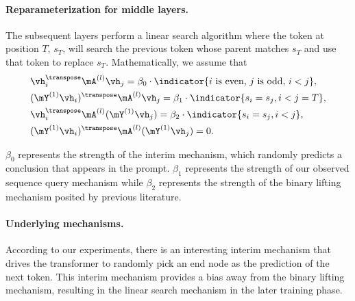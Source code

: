 \paragraph{Reparameterization for middle layers.} The subsequent layers perform a linear search algorithm where the token at position $T$, $s_T$, will search the previous token whose parent matches $s_T$ and use that token to replace $s_T$. Mathematically, we assume that
\begin{equation}
\label{eq:reparam_layer_2_component}
\begin{aligned}
    & \vh_i^\transpose\mA^{(l)}\vh_j = \beta_0 \cdot \indicator\{i \text{ is even, } j \text{ is odd, } i < j \}, \\
    & (\mY^{(1)}\vh_i)^\transpose\mA^{(l)}\vh_j = \beta_1 \cdot \indicator\{s_i=s_j, i <j=T\},
    \\  & \vh_i^\transpose\mA^{(l)}(\mY^{(1)}\vh_j) = \beta_2 \cdot \indicator\{s_i=s_j, i<j\}, 
    \\  & (\mY^{(1)}\vh_i)^\transpose\mA^{(l)}(\mY^{(1)}\vh_j) = 0.
\end{aligned}
\end{equation}

$\beta_0$ represents the strength of the interim mechanism, which randomly predicts a conclusion that appears in the prompt. $\beta_1$ represents the strength of our observed sequence query mechanism while $\beta_2$ represents the strength of the binary lifting mechanism posited by previous literature.

\paragraph{Underlying mechanisms.} According to our experiments, there is an interesting interim mechanism that drives the transformer to randomly pick an end node as the prediction of the next token. This interim mechanism provides a bias away from the binary lifting mechanism, resulting in the linear search mechanism in the later training phase. 

